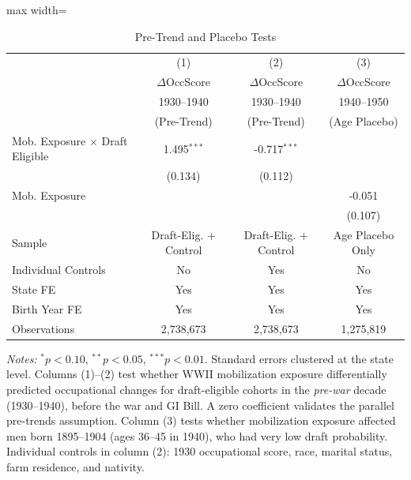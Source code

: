 \begin{table}[htbp]
\centering
\caption{Pre-Trend and Placebo Tests}
\label{tab:pretrend}
\begin{adjustbox}{max width=\textwidth}
\begin{tabular}{lccc}
\toprule
 & (1) & (2) & (3) \\
 & $\Delta$OccScore & $\Delta$OccScore & $\Delta$OccScore \\
 & 1930--1940 & 1930--1940 & 1940--1950 \\
 & (Pre-Trend) & (Pre-Trend) & (Age Placebo) \\
\midrule
Mob. Exposure $\times$ Draft Eligible & 1.495$^{***}$ & -0.717$^{***}$ & \\
 & (0.134) & (0.112) & \\[3pt]
Mob. Exposure & & & -0.051 \\
 & & & (0.107) \\
\midrule
Sample & Draft-Elig. + Control & Draft-Elig. + Control & Age Placebo Only \\
Individual Controls & No & Yes & No \\
State FE & Yes & Yes & Yes \\
Birth Year FE & Yes & Yes & Yes \\
\midrule
Observations & 2,738,673 & 2,738,673 & 1,275,819 \\
\bottomrule
\end{tabular}
\end{adjustbox}
\begin{tablenotes}
\small
\item \textit{Notes:} $^{*}p<0.10$, $^{**}p<0.05$, $^{***}p<0.01$. Standard errors clustered at the state level. Columns (1)--(2) test whether WWII mobilization exposure differentially predicted occupational changes for draft-eligible cohorts in the \textit{pre-war} decade (1930--1940), before the war and GI Bill. A zero coefficient validates the parallel pre-trends assumption. Column (3) tests whether mobilization exposure affected men born 1895--1904 (ages 36--45 in 1940), who had very low draft probability. Individual controls in column (2): 1930 occupational score, race, marital status, farm residence, and nativity.
\end{tablenotes}
\end{table}
